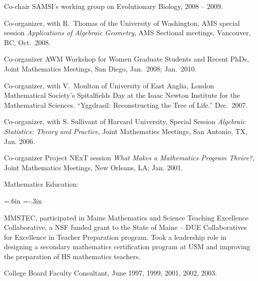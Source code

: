 \documentclass[10pt]{report}
\begin{document}
{Co-chair SAMSI's working group on Evolutionary Biology, 2008 -- 2009.

Co-organizer, with R.~Thomas of the University of Washington, AMS
special session {\sl Applications of Algebraic Geometry}, AMS
Sectional meetings, Vancouver, BC, Oct.~2008.

Co-organizer AWM Workshop for Women Graduate Students and Recent PhDs,
Joint Mathematics Meetings, San Diego, Jan.~2008; Jan.~2010.

Co-organizer, with V.~Moulton of University of East Anglia, London
Mathematical Society's Spitalfields Day at the Isaac Newton
Institute for the Mathematical Sciences.  ``Yggdrasil:
Reconstructing the Tree of Life.'' Dec.~2007.

Co-organizer, with S. Sullivant of Harvard University, Special Session
{\sl Algebraic Statistics:  Theory and Practice}, Joint Mathematics
Meetings, San Antonio, TX, Jan. 2006.

{}

Co-organizer Project NExT session {\it What Makes a Mathematics Program
Thrive?}, Joint Mathematics Meetings, New Orleans, LA; Jan. 2001.

\medskip

{\sc Mathematics Education:}

\smallskip

{ \leftskip=.6in \parindent=-.3in  \parskip=3pt

MMSTEC, participated in Maine Mathematics and Science Teaching
Excellence Collaborative, a NSF funded grant to the State of Maine --
DUE Collaboratives for Excellence in Teacher Preparation program. Took
a leadership role in designing a secondary mathematics certification
program at USM and improving the preparation of HS mathematics
teachers.

College Board Faculty Consultant, June 1997, 1999, 2001, 2002, 2003.

\begin{comment}
Undergraduate Research/Independent Studies.  Geometry of Surfaces,
Applications of Integration in the Sciences, Introduction to Proofs,
Networking, Using {\it Mathematica} to Model Solutions to the Lorenz
Differential Equations, Senior Seminar Talks: Number Theory
and Atonality; Generating Functions; Divergence Theorem and Gauss Flux
Theorem; Magic Squares; Latin squares and the design of tournaments.
\end{comment}

}}
\end{document}
